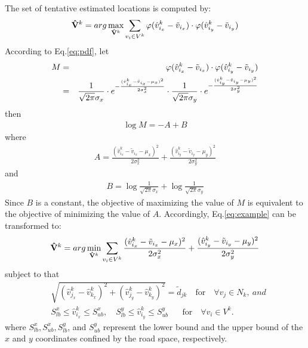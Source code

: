 \documentclass[letterpaper, 10 pt, conference]{ieeeconf}
\begin{document}
\noindent The set of tentative estimated locations is computed by:
\begin{align}
{\mathbf{\hat V}}^k  = arg{\rm{ }}\mathop {\max }\limits_{{\mathbf{\hat V}}^k } \sum\limits_{v_i  \in V^k } {\varphi (\hat v_{i_x }^k  - \tilde v_{i_x } ) \cdot \varphi (\hat v_{i_y }^k  - \tilde v_{i_y } )}
\label{eq:example}
\end{align}
According to Eq.\ref{eq:pdf}, let
\begin{eqnarray*}
 M &=& \varphi (\hat v_{i_x }^k  - \tilde v_{i_x } ) \cdot \varphi (\hat v_{i_y }^k  - \tilde v_{i_y } ) \\
 {\rm{    }} &=& \frac{1}{{\sqrt {2\pi } \sigma _x }} \cdot e^{ - \frac{{(\hat v_{i_x }^k  - \tilde v_{i_x }  - \mu _x )^2 }}{{2\sigma _x ^2 }}}  \cdot \frac{1}{{\sqrt {2\pi } \sigma _y }} \cdot e^{ - \frac{{(\hat v_{i_y }^k  - \tilde v_{i_y }  - \mu _y )^2 }}{{2\sigma _y ^2 }}}
\end{eqnarray*}
then
\begin{align}
\log M =  -A+B \nonumber
\end{align}
\noindent where
\begin{align}
A =   {\frac{{(\hat v_{i_x }^k  - \tilde v_{i_x }  - \mu _x )^2 }}{{2\sigma _x ^2 }} + \frac{{(\hat v_{i_y }^k  - \tilde v_{i_y }  - \mu _y )^2 }}{{2\sigma _y ^2 }}} \nonumber
\end{align}
\noindent and
\begin{align}
B =  \log \frac{1}{{\sqrt {2\pi } \sigma _x }} + \log \frac{1}{{\sqrt {2\pi } \sigma _y }}\nonumber
\end{align}
\noindent Since $B$ is a constant, the objective of maximizing the value of $M$ is equivalent to the objective of minimizing the value of $A$. Accordingly, Eq.\ref{eq:example} can be transformed to:
\begin{eqnarray}
{\mathbf{\hat V}}^k  = arg{\rm{ }}\mathop {\min }\limits_{{\bf{\hat V}}^k } \sum\limits_{v_i  \in V^k } {\frac{{(\hat v_{i_x }^k  - \tilde v_{i_x }  - \mu _x )^2 }}{{2\sigma _x ^2 }} + \frac{{(\hat v_{i_y }^k  - \tilde v_{i_y }  - \mu _y )^2 }}{{2\sigma _y ^2 }}}
\end{eqnarray}
subject to that
\begin{align*}
&\sqrt {(\hat v_{j_x }^k  - \hat v_{k_x }^k )^2  + (\hat v_{j_y }^k  - \hat v_{k_y }^k )^2 }  = \tilde d_{jk} \quad\mbox{for}\quad
\forall v_j  \in N_k, ~and \\&
S_{lb}^x  \le \hat v_{i_x }^k  \le S_{ub}^x, \quad S_{lb}^y  \le \hat v_{i_y }^k  \le S_{ub}^y \,\,\,\,\quad\mbox{for}\quad
\forall v_i  \in V^k.
\end{align*}
where
$S_{lb}^x ,S_{ub}^x ,S_{lb}^y$, and $S_{ub}^y $ represent the lower bound and the upper bound of the $x$ and $y$ coordinates confined by the road space, respectively.
\end{document}

